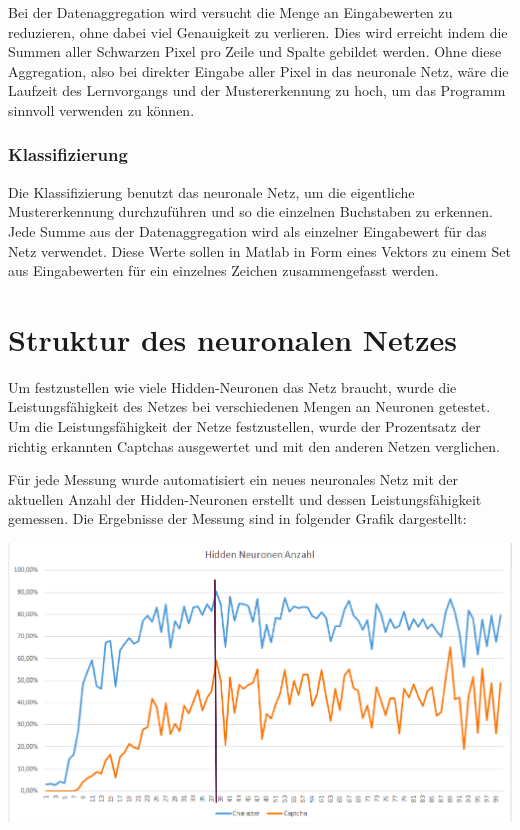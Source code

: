 Bei der Datenaggregation wird versucht die Menge an Eingabewerten zu reduzieren,
ohne dabei viel Genauigkeit zu verlieren. Dies wird erreicht indem 
die Summen aller Schwarzen Pixel pro Zeile und Spalte gebildet werden. Ohne diese Aggregation, also bei direkter Eingabe aller Pixel in das
neuronale Netz, wäre die Laufzeit des Lernvorgangs und der Mustererkennung zu
hoch, um das Programm sinnvoll verwenden zu können.
\subsubsection{Klassifizierung}

Die Klassifizierung benutzt das neuronale Netz, um die eigentliche
Mustererkennung durchzuführen und so die einzelnen Buchstaben zu
erkennen. Jede Summe aus der Datenaggregation wird als einzelner Eingabewert
für das Netz verwendet. Diese Werte sollen in Matlab in Form eines Vektors zu
einem Set aus Eingabewerten für ein einzelnes Zeichen zusammengefasst werden.

\section{Struktur des neuronalen Netzes}

Um festzustellen wie viele Hidden-Neuronen das Netz braucht, wurde die
Leistungsfähigkeit des Netzes bei verschiedenen Mengen an Neuronen getestet.
Um die Leistungsfähigkeit der Netze festzustellen, wurde der Prozentsatz der richtig
erkannten Captchas ausgewertet und mit den anderen Netzen verglichen. 

Für jede Messung wurde automatisiert ein neues neuronales Netz mit der aktuellen
Anzahl der Hidden-Neuronen erstellt und dessen Leistungsfähigkeit gemessen.
Die Ergebnisse der Messung sind in folgender Grafik dargestellt:

\includegraphics[width=14cm]{res/performance.png}

